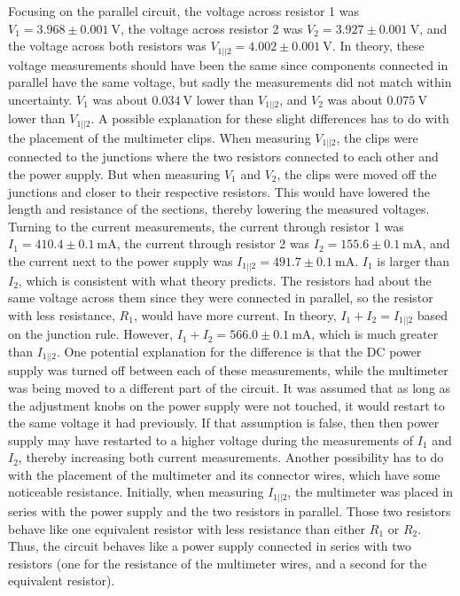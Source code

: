 \documentclass[12pt]{iopart} %
\gdef\units#1{~\mathrm{#1}}
\begin{document}
Focusing on the parallel circuit, the voltage across resistor 1 was $V_1 = 3.968 \pm 0.001 \units{V}$, the voltage across resistor 2 was $V_2 = 3.927 \pm 0.001 \units{V}$, and the voltage across both resistors was $V_{1||2} = 4.002 \pm 0.001 \units{V}$.
In theory, these voltage measurements should have been the same since components connected in parallel have the same voltage, but sadly the measurements did not match within uncertainty.
$V_1$ was about $0.034 \units{V}$ lower than $V_{1||2}$, and $V_2$ was about $0.075 \units{V}$ lower than $V_{1||2}$.
A possible explanation for these slight differences has to do with the placement of the multimeter clips.
When measuring $V_{1||2}$, the clips were connected to the junctions where the two resistors connected to each other and the power supply.
But when measuring $V_1$ and $V_2$, the clips were moved off the junctions and closer to their respective resistors.
This would have lowered the length and resistance of the sections, thereby lowering the measured voltages.
Turning to the current measurements, the current through resistor 1 was $I_1 = 410.4 \pm 0.1 \units{mA}$, the current through resistor 2 was $I_2 = 155.6 \pm 0.1 \units{mA}$, and the current next to the power supply was $I_{1||2} = 491.7 \pm 0.1 \units{mA}$.
$I_1$ is larger than $I_2$, which is consistent with what theory predicts.
The resistors had about the same voltage across them since they were connected in parallel, so the resistor with less resistance, $R_1$, would have more current.
In theory, $I_1 + I_2 = I_{1||2}$ based on the junction rule.
However, $I_1 + I_2 = 566.0 \pm 0.1 \units{mA}$, which is much greater than $I_{1||2}$.
One potential explanation for the difference is that the DC power supply was turned off between each of these measurements, while the multimeter was being moved to a different part of the circuit.
It was assumed that as long as the adjustment knobs on the power supply were not touched, it would restart to the same voltage it had previously.
If that assumption is false, then then power supply may have restarted to a higher voltage during the measurements of $I_1$ and $I_2$, thereby increasing both current measurements.
Another possibility has to do with the placement of the multimeter and its connector wires, which have some noticeable resistance.
Initially, when measuring $I_{1||2}$, the multimeter was placed in series with the power supply and the two resistors in parallel.
Those two resistors behave like one equivalent resistor with less resistance than either $R_1$ or $R_2$.
Thus, the circuit behaves like a power supply connected in series with two resistors (one for the resistance of the multimeter wires, and a second for the equivalent resistor).
\end{document}
